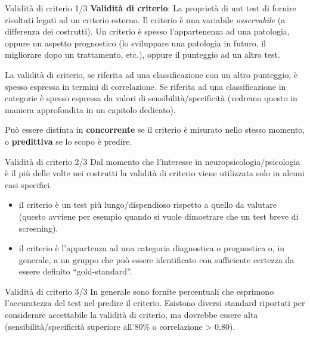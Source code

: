 \documentclass[
  ignorenonframetext,
]{beamer}
\providecommand{\tightlist}{%
  \setlength{\itemsep}{0pt}\setlength{\parskip}{0pt}}
\begin{document}
\begin{frame}{Validità di criterio 1/3}
\label{validituxe0-di-criterio-13}
\textbf{Validità di criterio}: La proprietà di unt test di fornire
risultati legati ad un criterio esterno. Il criterio è una variabile
\emph{osservabile} (a differenza dei costrutti). Un criterio è spesso
l'appartenenza ad una patologia, oppure un aspetto prognostico (lo
sviluppare una patologia in futuro, il migliorare dopo un trattamento,
etc.), oppure il punteggio ad un altro test.

La validità di criterio, se riferita ad una classificazione con un altro
punteggio, è spesso espressa in termini di correlazione. Se riferita ad
una classificazione in categorie è spesso espressa da valori di
sensibilità/specificità (vedremo questo in maniera approfondita in un
capitolo dedicato).

Può essere distinta in \textbf{concorrente} se il criterio è misurato
nello stesso momento, o \textbf{predittiva} se lo scopo è predire.
\end{frame}

\begin{frame}{Validità di criterio 2/3}
\label{validituxe0-di-criterio-23}
Dal momento che l'interesse in neuropsicologia/psicologia è il più delle
volte nei costrutti la validità di criterio viene utilizzata solo in
alcuni casi specifici.

\begin{itemize}
\tightlist
\item
  il criterio è un test più lungo/dispendioso rispetto a quello da
  valutare (questo avviene per esempio quando si vuole dimostrare che un
  test breve di screening).
\item
  il criterio è l'appartenza ad una categoria diagnostica o prognostica
  o, in generale, a un gruppo che può essere identificato con
  sufficiente certezza da essere definito ``gold-standard''.
\end{itemize}
\end{frame}

\begin{frame}{Validità di criterio 3/3}
\label{validituxe0-di-criterio-33}
In generale sono fornite percentuali che esprimono l'accuratezza del
test nel predire il criterio. Esistono diversi standard riportati per
considerare accettabile la validità di criterio, ma dovrebbe essere alta
(sensibilità/specificità superiore all'80\% o correlazione
\textgreater{} 0.80).
\end{frame}
\end{document}

